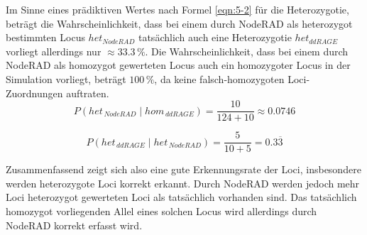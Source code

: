 Im Sinne eines prädiktiven Wertes nach Formel \eqref{eqn:5-2} für die Heterozygotie, beträgt die Wahrscheinlichkeit, dass bei einem durch NodeRAD als heterozygot bestimmten Locus $het_{NodeRAD}$ tatsächlich auch eine Heterozygotie $het_{ddRAGE}$ vorliegt allerdings nur $ \approx 33.3\, \% $. Die Wahrscheinlichkeit, dass bei einem durch NodeRAD als homozygot gewerteten Locus auch ein homozygoter Locus in der Simulation vorliegt, beträgt $100\, \%$, da keine falsch-homozygoten Loci-Zuordnungen auftraten.\\

\begin{equation} \label{eqn:5-1}
\tag{5-1}
P(het_{\, NodeRAD} \; | \; hom_{\, ddRAGE}) = \frac{10}{124+10} \approx 0.0746
\end{equation}

\begin{equation} \label{eqn:5-2}
\tag{5-2}
P(het_{\, ddRAGE} \; | \; het_{\, NodeRAD}) = \frac{5}{10+5} = 0.3 \overline{3}
\end{equation}

Zusammenfassend zeigt sich also eine gute Erkennungsrate der Loci, insbesondere werden heterozygote Loci korrekt erkannt. Durch NodeRAD werden jedoch mehr Loci heterozygot gewerteten Loci als tatsächlich vorhanden sind. Das tatsächlich homozygot vorliegenden Allel eines solchen Locus wird allerdings durch NodeRAD korrekt erfasst wird. 

\let\cleardoublepage\clearpage